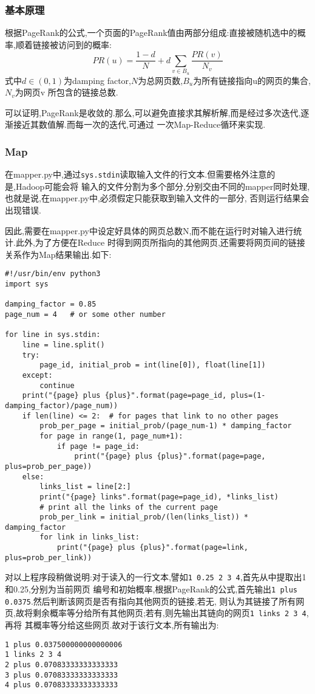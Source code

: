 \documentclass[a4paper]{article}
\begin{document}
            \subsubsection{基本原理}
根据PageRank的公式,一个页面的PageRank值由两部分组成:直接被随机选中的概率,顺着链接被访问到的概率:
$$PR(u) = \frac{1-d}{N} + d\sum_{v\in B_{u}}\frac{PR(v)}{N_{v}}$$
式中$d\in(0,1)$为damping factor,$N$为总网页数,$B_{u}$为所有链接指向u的网页的集合,$N_{v}$为网页v
所包含的链接总数.

可以证明,PageRank是收敛的.那么,可以避免直接求其解析解,而是经过多次迭代,逐渐接近其数值解.而每一次的迭代,可通过
一次Map-Reduce循环来实现.
            \subsubsection{Map}
在mapper.py中,通过\texttt{sys.stdin}读取输入文件的行文本.但需要格外注意的是,Hadoop可能会将
输入的文件分割为多个部分,分别交由不同的mapper同时处理,也就是说,在mapper.py中,必须假定只能获取到输入文件的一部分,
否则运行结果会出现错误.

因此,需要在mapper.py中设定好具体的网页总数N,而不能在运行时对输入进行统计.此外,为了方便在Reduce
时得到网页所指向的其他网页,还需要将网页间的链接关系作为Map结果输出.如下:
\begin{verbatim}
#!/usr/bin/env python3
import sys

damping_factor = 0.85
page_num = 4   # or some other number

for line in sys.stdin:
    line = line.split()
    try:
        page_id, initial_prob = int(line[0]), float(line[1])
    except:
        continue
    print("{page} plus {plus}".format(page=page_id, plus=(1-damping_factor)/page_num))
    if len(line) <= 2:  # for pages that link to no other pages
        prob_per_page = initial_prob/(page_num-1) * damping_factor
        for page in range(1, page_num+1):
            if page != page_id:
                print("{page} plus {plus}".format(page=page, plus=prob_per_page))
    else:
        links_list = line[2:]
        print("{page} links".format(page=page_id), *links_list)  
        # print all the links of the current page
        prob_per_link = initial_prob/(len(links_list)) * damping_factor
        for link in links_list:
            print("{page} plus {plus}".format(page=link, plus=prob_per_link))
\end{verbatim}

对以上程序段稍做说明:对于读入的一行文本,譬如\texttt{1 0.25 2 3 4},首先从中提取出1和0.25,分别为当前网页
编号和初始概率,根据PageRank的公式,首先输出\texttt{1 plus 0.0375}.然后判断该网页是否有指向其他网页的链接,若无,
则认为其链接了所有网页,故将剩余概率等分给所有其他网页;若有,则先输出其链向的网页\texttt{1 links 2 3 4},再将
其概率等分给这些网页.故对于该行文本,所有输出为:
\begin{verbatim}
1 plus 0.037500000000000006
1 links 2 3 4
2 plus 0.07083333333333333
3 plus 0.07083333333333333
4 plus 0.07083333333333333
\end{verbatim}
\end{document}
